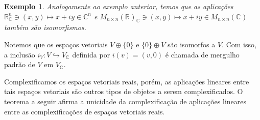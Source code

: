 \documentclass[12pt]{book}
\newtheorem{exemplo}[teorema]{Exemplo}
\newcommand{\complexificacao}[1]{#1_{\complexo{}}}
\newcommand{\complexo}[1]{\mathbb{C}^{#1}}
\newcommand{\matrizquadcomplexa}[1]{M_{#1 \times #1}(\complexo{})}
\newcommand{\matrizquadreal}[1]{M_{#1 \times #1}(\real{})}
\newcommand{\real}[1]{\mathbb{R}^{#1}}
\begin{document}
	\begin{exemplo}\label{exemplo_complexificacao_matrizes}
		Analogamente ao exemplo anterior, temos que as aplicações $\complexificacao{\real{n}} \ni (x,y) \mapsto x+iy \in \complexo{n}$ e  $\complexificacao{\matrizquadreal{n}} \ni (x,y) \mapsto x+iy \in \matrizquadcomplexa{n}$ também são isomorfismos.
	\end{exemplo}
	
	Notemos que os espaços vetoriais $V\oplus\{0\}$ e $\{0\}\oplus V$ são isomorfos a $V$. Com isso, a inclusão $i_{V} :V \hookrightarrow \complexificacao{V}$ definida por $i(v) = (v, 0)$ é chamada de mergulho padrão de $V$ em $\complexificacao{V}$.
	
	Complexificamos os espaços vetoriais reais, porém, as aplicações lineares entre tais espaços vetoriais são outros tipos de objetos a serem complexificados. O teorema a seguir afirma a unicidade da complexificação de aplicações lineares entre as complexificações de espaços vetoriais reais.
	
\end{document}
